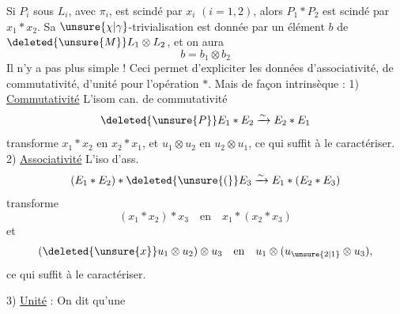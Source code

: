 Si $P_i$ sous $L_i$, avec $\pi_i$, est scindé par $x_i$ $(i=1,2)$, alors $P_1*P_2$ est scindé par $x_1*x_2$. Sa $\unsure{\chi|\gamma}$-trivialisation est donnée par un élément $b$ de $\deleted{\unsure{M}}L_1\otimes L_2$, et on aura
\[
b=b_1\otimes b_2
\]
Il n'y a pas plus simple !
Ceci permet d'expliciter les données d'associativité, de commutativité, d'unité pour l'opération $*$. Mais de façon intrinsèque :
1) \uline{Commutativité} L'isom can. de commutativité
\[
\deleted{\unsure{P}}E_1*E_2\xrightarrow{\sim}E_2*E_1
\]
transforme $x_1*x_2$ en $x_2*x_1$, et $u_1\otimes u_2$ en $u_2\otimes u_1$, ce qui suffit à le caractériser.
2) \uline{Associativité} L'iso d'ass.
\[
(E_1*E_2)*\deleted{\unsure{(}}E_3\xrightarrow{\sim}E_1*(E_2*E_3)
\]
transforme
\[
(x_1*x_2)*x_3\quad\text{en}\quad x_1*(x_2*x_3)
\]
et
\[
(\deleted{\unsure{x}}u_1\otimes u_2)\otimes u_3\quad\text{en}\quad u_1\otimes(u_{\unsure{2|1}}\otimes u_3),
\]
ce qui suffit à le caractériser.

3) \uline{Unité} : On  dit qu'une
